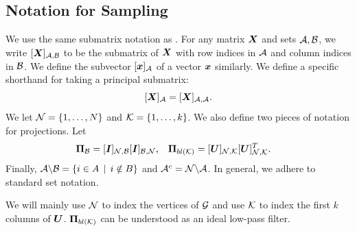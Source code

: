 \subsection{Notation for Sampling}
\label{sec:notation}
We use the same submatrix notation as \cite{zhang2000schur}.  For any matrix $\bm{X}$ and sets $\mathcal{A},\mathcal{B}$, we write $\matrsub[A,B]{X}$ to be the submatrix of $\bm{X}$ with row indices in $\mathcal{A}$ and column indices in $\mathcal{B}$. We define the subvector $\vectsub[A]{x}$ of a vector $\bm{x}$ similarly. We define a specific shorthand for taking a principal submatrix:
\begin{equation}
    \matrsub[A]{X} = \matrsub[A,A]{X}.
\end{equation}
We let $\mathcal{N} = \{1, \ldots, N\}$ and $\mathcal{K} = \{1, \ldots, k\}$. We also define two pieces of notation for projections. Let
\begin{align}
    \proj{B} &= \matrsub[N,B]{I}\matrsub[B,N]{I},   &
    \projbl &= \matrsubU{N}\matrsubU{N}^{T}.
\end{align}
Finally, $\mathcal{A} \backslash \mathcal{B} = \{ i \in A \, \mid \, i \notin B \} $ and $\mathcal{A}^{c} = \mathcal{N} \backslash \mathcal{A}$. In general, we adhere to standard set notation.

{\color{black} We will mainly use $\mathcal{N}$ to index the vertices of $\mathcal{G}$ and use $\mathcal{K}$ to index the first $k$ columns of $\bm{U}$. $\projbl$ can be understood as an ideal low-pass filter.}

